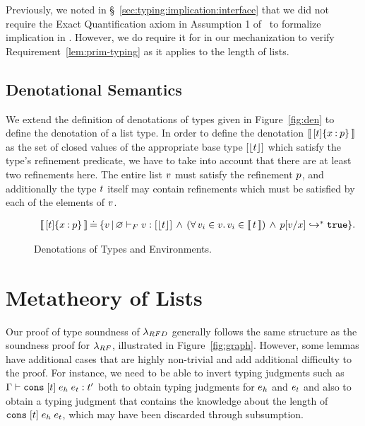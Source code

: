 Previously, we noted in \S~\ref{sec:typing:implication:interface}
that we did not require the Exact Quantification axiom in
Assumption 1 of~\cite{Knowles09} to formalize implication in \sysrf.
% 
However, we do require it for \sysrfd in our mechanization 
to verify Requirement~\ref{lem:prim-typing} as it applies to the
length of lists.

\subsection{Denotational Semantics}
\label{sec:lists:denotational}

We extend the definition of denotations of types given
in Figure~\ref{fig:den} to define the denotation of a list type.
%
In order to define the denotation 
$\llbracket\, {{[t]}\{x \mathbin{:} p\}} \,\rrbracket$
as the set of closed values
of the appropriate base type $[\lfloor{t}\rfloor]$
which satisfy the type's refinement predicate,
we have to take into account that there are at least two
refinements here. The entire list $v$ must satisfy
the refinement $p$, and additionally the type
$t$ itself may contain refinements which must
be satisfied by each of the elements of $v$.

\begin{figure}
$$\begin{array}{r@{\hskip 0.03in}c@{\hskip 0.03in}l}
\denote{\breft{\listtype{\stype}}{x}{p}} & \defeq &
  \setcomp{\sval}{\hasftype{\varnothing}{\sval}{\listtype{\forgetreft{\stype}}} 
  \,\wedge\, (\forall\, v_i\in v.\, v_i \in \denote{t})
  \,\wedge\, \evalsTo{\subst{p}{x}{\sval}}{\ttrue}}.
\end{array}$$
\vspace{-0.0cm}
\caption{Denotations of Types and Environments.}
\label{fig:denD}
\vspace{-0.0cm}
\end{figure}

\section{Metatheory of Lists}

Our proof of type soundness of $\lambda_{RFD}$ generally follows
the same structure as the soundness proof for $\lambda_{RF}$,
illustrated in Figure~\ref{fig:graph}.
%
However, some lemmas have additional cases that are highly 
non-trivial and add additional difficulty to the proof. 
%
For instance, we need to be able to invert typing judgments
such as 
${\mathrm{\Gamma}} \vdash {\ensuremath{\texttt{cons}\;[{t}]\;{e_h}\;{e_t}}} : {t'}$
both to obtain typing judgments for $e_h$ and $e_t$
and also to obtain a typing judgment that contains the 
knowledge about the length of $\texttt{cons}\;[{t}]\;{e_h}\;{e_t}$,
which may have been discarded through subsumption.

